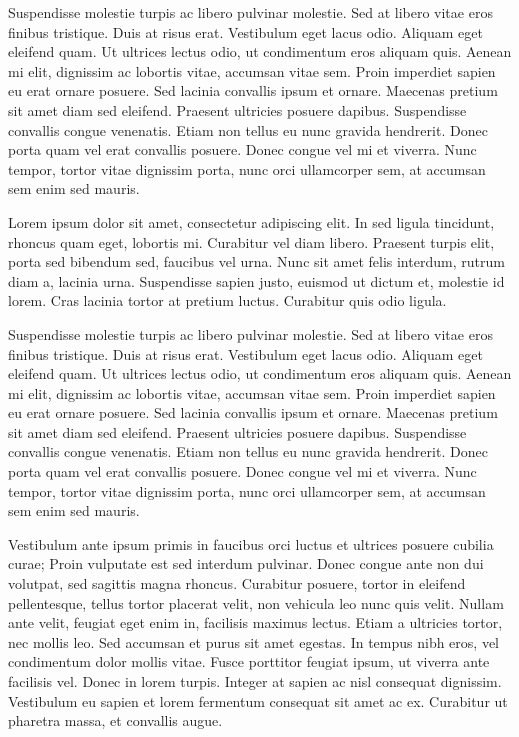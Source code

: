 Suspendisse molestie turpis ac libero pulvinar molestie. Sed at libero vitae eros finibus tristique. Duis at risus erat. Vestibulum eget lacus odio. Aliquam eget eleifend quam. Ut ultrices lectus odio, ut condimentum eros aliquam quis. Aenean mi elit, dignissim ac lobortis vitae, accumsan vitae sem. Proin imperdiet sapien eu erat ornare posuere. Sed lacinia convallis ipsum et ornare. Maecenas pretium sit amet diam sed eleifend. Praesent ultricies posuere dapibus. Suspendisse convallis congue venenatis. Etiam non tellus eu nunc gravida hendrerit. Donec porta quam vel erat convallis posuere. Donec congue vel mi et viverra. Nunc tempor, tortor vitae dignissim porta, nunc orci ullamcorper sem, at accumsan sem enim sed mauris. 


Lorem ipsum dolor sit amet, consectetur adipiscing elit. In sed ligula tincidunt, rhoncus quam eget, lobortis mi. Curabitur vel diam libero. Praesent turpis elit, porta sed bibendum sed, faucibus vel urna. Nunc sit amet felis interdum, rutrum diam a, lacinia urna. Suspendisse sapien justo, euismod ut dictum et, molestie id lorem. Cras lacinia tortor at pretium luctus. Curabitur quis odio ligula.

Suspendisse molestie turpis ac libero pulvinar molestie. Sed at libero vitae eros finibus tristique. Duis at risus erat. Vestibulum eget lacus odio. Aliquam eget eleifend quam. Ut ultrices lectus odio, ut condimentum eros aliquam quis. Aenean mi elit, dignissim ac lobortis vitae, accumsan vitae sem. Proin imperdiet sapien eu erat ornare posuere. Sed lacinia convallis ipsum et ornare. Maecenas pretium sit amet diam sed eleifend. Praesent ultricies posuere dapibus. Suspendisse convallis congue venenatis. Etiam non tellus eu nunc gravida hendrerit. Donec porta quam vel erat convallis posuere. Donec congue vel mi et viverra. Nunc tempor, tortor vitae dignissim porta, nunc orci ullamcorper sem, at accumsan sem enim sed mauris. 

Vestibulum ante ipsum primis in faucibus orci luctus et ultrices posuere cubilia curae; Proin vulputate est sed interdum pulvinar. Donec congue ante non dui volutpat, sed sagittis magna rhoncus. Curabitur posuere, tortor in eleifend pellentesque, tellus tortor placerat velit, non vehicula leo nunc quis velit. Nullam ante velit, feugiat eget enim in, facilisis maximus lectus. Etiam a ultricies tortor, nec mollis leo. Sed accumsan et purus sit amet egestas. In tempus nibh eros, vel condimentum dolor mollis vitae. Fusce porttitor feugiat ipsum, ut viverra ante facilisis vel. Donec in lorem turpis. Integer at sapien ac nisl consequat dignissim. Vestibulum eu sapien et lorem fermentum consequat sit amet ac ex. Curabitur ut pharetra massa, et convallis augue.

